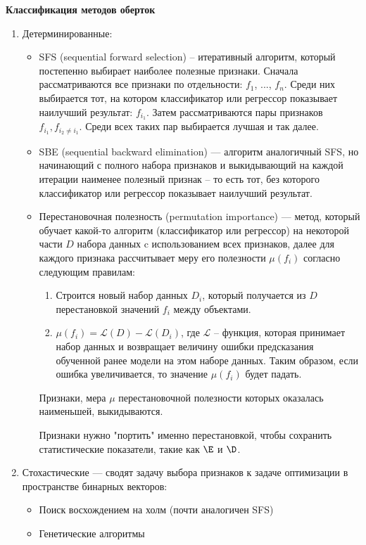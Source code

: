 \textbf{Классификация методов оберток}
\begin{enumerate}
    \item Детерминированные:
    \begin{itemize}
        \item SFS (sequential forward selection) -- итеративный алгоритм, который постепенно выбирает наиболее полезные признаки. Сначала рассматриваются все признаки по отдельности: $f_1$, ..., $f_n$. Среди них выбирается тот, на котором классификатор или регрессор показывает наилучший результат: $f_{i_1}$. Затем рассматриваются пары признаков $f_{i_1}, f_{i_2\ne i_1}$. Среди всех таких пар выбирается лучшая и так далее.
        \item SBE (sequential backward elimination) --- алгоритм аналогичный SFS, но начинающий с полного набора признаков и выкидывающий на каждой итерации наименее полезный признак -- то есть тот, без которого классификатор или регрессор показывает наилучший результат.
        \item Перестановочная полезность (permutation importance) --- метод, который обучает какой-то алгоритм (классификатор или регрессор) на некоторой части $D$ набора данных c использованием всех признаков, далее для каждого признака рассчитывает меру его полезности $\mu(f_i)$ согласно следующим правилам: 
        \begin{enumerate}
            \item Строится новый набор данных $D_i$, который получается из $D$ перестановкой значений $f_i$ между объектами.
            \item $\mu(f_i)=\mathcal{L}(D)-\mathcal{L}(D_i)$, где $\mathcal{L}$ -- функция, которая принимает набор данных и возвращает величину ошибки предсказания обученной ранее модели на этом наборе данных. Таким образом, если ошибка увеличивается, то значение $\mu(f_i)$ будет падать.
        \end{enumerate}
        Признаки, мера $\mu$ перестановочной полезности которых оказалась наименьшей, выкидываются.
        \begin{remark}
            Признаки нужно "портить" именно перестановкой, чтобы сохранить статистические показатели, такие как $\E$ и $\D$.
        \end{remark}
    \end{itemize}
    \item Стохастические --- сводят задачу выбора признаков к задаче оптимизации в пространстве бинарных векторов:\
    \begin{itemize}
        \item Поиск восхождением на холм (почти аналогичен SFS)
        \item Генетические алгоритмы
    \end{itemize}
\end{enumerate}

